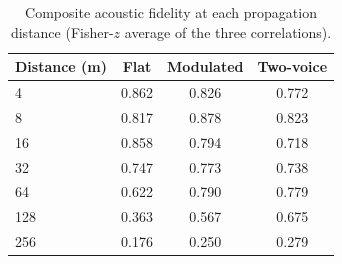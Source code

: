 \begin{table}[H]
\centering
\caption{Composite acoustic fidelity at each propagation distance (Fisher-$z$ average of the three correlations).}
\label{tab:p2comp}
\small
\begin{tabular}{lccc}
\toprule
Distance (m) & Flat & Modulated & Two-voice \\
\midrule
4 & 0.862 & 0.826 & 0.772 \\
8 & 0.817 & 0.878 & 0.823 \\
16 & 0.858 & 0.794 & 0.718 \\
32 & 0.747 & 0.773 & 0.738 \\
64 & 0.622 & 0.790 & 0.779 \\
128 & 0.363 & 0.567 & 0.675 \\
256 & 0.176 & 0.250 & 0.279 \\
\bottomrule
\end{tabular}
\end{table}